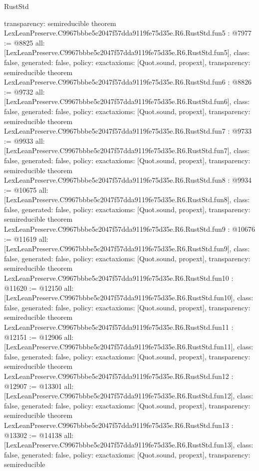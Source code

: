 \begin{lexlean}{RustStd}
\begin{coremodule}
{  transparency: semireducible
}
theorem LexLeanPreserve.C9967bbbe5c2047f57dda9119fe75d35e.R6.RustStd.fun5 : @7977 := @8825 {
  all: [LexLeanPreserve.C9967bbbe5c2047f57dda9119fe75d35e.R6.RustStd.fun5],
  class: false,
  generated: false,
  policy: exact{axioms: [Quot.sound, propext]},
  transparency: semireducible
}
theorem LexLeanPreserve.C9967bbbe5c2047f57dda9119fe75d35e.R6.RustStd.fun6 : @8826 := @9732 {
  all: [LexLeanPreserve.C9967bbbe5c2047f57dda9119fe75d35e.R6.RustStd.fun6],
  class: false,
  generated: false,
  policy: exact{axioms: [Quot.sound, propext]},
  transparency: semireducible
}
theorem LexLeanPreserve.C9967bbbe5c2047f57dda9119fe75d35e.R6.RustStd.fun7 : @9733 := @9933 {
  all: [LexLeanPreserve.C9967bbbe5c2047f57dda9119fe75d35e.R6.RustStd.fun7],
  class: false,
  generated: false,
  policy: exact{axioms: [Quot.sound, propext]},
  transparency: semireducible
}
theorem LexLeanPreserve.C9967bbbe5c2047f57dda9119fe75d35e.R6.RustStd.fun8 : @9934 := @10675 {
  all: [LexLeanPreserve.C9967bbbe5c2047f57dda9119fe75d35e.R6.RustStd.fun8],
  class: false,
  generated: false,
  policy: exact{axioms: [Quot.sound, propext]},
  transparency: semireducible
}
theorem LexLeanPreserve.C9967bbbe5c2047f57dda9119fe75d35e.R6.RustStd.fun9 : @10676 := @11619 {
  all: [LexLeanPreserve.C9967bbbe5c2047f57dda9119fe75d35e.R6.RustStd.fun9],
  class: false,
  generated: false,
  policy: exact{axioms: [Quot.sound, propext]},
  transparency: semireducible
}
theorem LexLeanPreserve.C9967bbbe5c2047f57dda9119fe75d35e.R6.RustStd.fun10 : @11620 := @12150 {
  all: [LexLeanPreserve.C9967bbbe5c2047f57dda9119fe75d35e.R6.RustStd.fun10],
  class: false,
  generated: false,
  policy: exact{axioms: [Quot.sound, propext]},
  transparency: semireducible
}
theorem LexLeanPreserve.C9967bbbe5c2047f57dda9119fe75d35e.R6.RustStd.fun11 : @12151 := @12906 {
  all: [LexLeanPreserve.C9967bbbe5c2047f57dda9119fe75d35e.R6.RustStd.fun11],
  class: false,
  generated: false,
  policy: exact{axioms: [Quot.sound, propext]},
  transparency: semireducible
}
theorem LexLeanPreserve.C9967bbbe5c2047f57dda9119fe75d35e.R6.RustStd.fun12 : @12907 := @13301 {
  all: [LexLeanPreserve.C9967bbbe5c2047f57dda9119fe75d35e.R6.RustStd.fun12],
  class: false,
  generated: false,
  policy: exact{axioms: [Quot.sound, propext]},
  transparency: semireducible
}
theorem LexLeanPreserve.C9967bbbe5c2047f57dda9119fe75d35e.R6.RustStd.fun13 : @13302 := @14138 {
  all: [LexLeanPreserve.C9967bbbe5c2047f57dda9119fe75d35e.R6.RustStd.fun13],
  class: false,
  generated: false,
  policy: exact{axioms: [Quot.sound, propext]},
  transparency: semireducible
}
\end{coremodule}
\end{lexlean}
